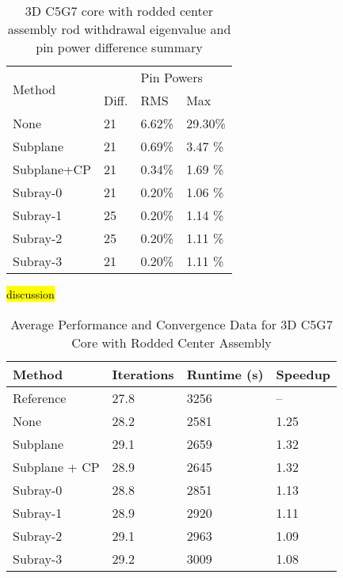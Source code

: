 \begin{table}
    \centering
    \caption[3D C5G7 Core with Rodded Center Assembly Results]{3D C5G7 core with rodded center assembly rod withdrawal eigenvalue and pin power difference summary}\label{t:c5g7-3d-core-center}
    \begin{tabular}{l l l l}\toprule
        \multirow{2}{*}{Method} & \keff{} & \multicolumn{2}{l}{Pin Powers} \\
        & Diff. & RMS & Max \\\midrule
None        & 21 & 6.62\% & 29.30\% \\
Subplane    & 21 & 0.69\% & 3.47 \% \\
Subplane+CP & 21 & 0.34\% & 1.69 \% \\
Subray-0    & 21 & 0.20\% & 1.06 \% \\
Subray-1    & 25 & 0.20\% & 1.14 \% \\
Subray-2    & 25 & 0.20\% & 1.11 \% \\
Subray-3    & 21 & 0.20\% & 1.11 \% \\
        \bottomrule
    \end{tabular}
\end{table}

\hl{discussion}

\begin{table}[h]
    \centering
    \caption[3D C5G7 Core with Rodded Center Assembly Performance]{Average Performance and Convergence Data for 3D C5G7 Core with Rodded Center  Assembly}\label{t:subray-performance-3Dcore-center}
    \begin{tabular}{l l l l}\toprule
        Method & Iterations & Runtime (s) & Speedup \\\midrule
        Reference     & 27.8 & 3256 & -- \\
        None          & 28.2 & 2581 & 1.25 \\
        Subplane      & 29.1 & 2659 & 1.32 \\
        Subplane + CP & 28.9 & 2645 & 1.32 \\
        Subray-0      & 28.8 & 2851 & 1.13 \\
        Subray-1      & 28.9 & 2920 & 1.11 \\
        Subray-2      & 29.1 & 2963 & 1.09 \\
        Subray-3      & 29.2 & 3009 & 1.08 \\
        \bottomrule
    \end{tabular}
\end{table}

